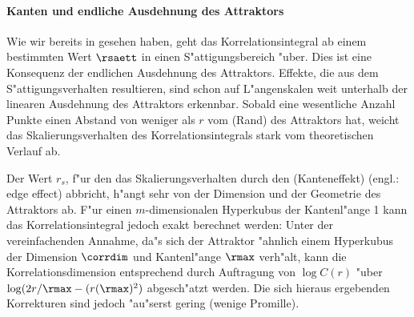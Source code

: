 \paragraph{Kanten und endliche Ausdehnung des Attraktors}
Wie wir bereits in  gesehen haben, geht das Korrelationsintegral ab einem
bestimmten Wert $\rsaett$ in einen S"attigungsbereich "uber. Dies ist eine Konsequenz der
endlichen Ausdehnung des Attraktors. Effekte, die aus dem S"attigungsverhalten resultieren, 
sind schon auf L"angen\-skalen weit unterhalb der linearen Ausdehnung des Attraktors
erkennbar. Sobald eine wesentliche Anzahl Punkte einen Abstand von weniger als $r$ vom
\naja(Rand) des Attraktors hat, weicht das Skalierungsverhalten des Korrelationsintegrals
stark vom theoretischen Verlauf ab.

Der Wert $r_s$, f"ur den das Skalierungsverhalten durch den \begriff(Kanteneffekt)
(engl.: edge effect) abbricht, h"angt sehr von
der Dimension und der Geometrie des Attraktors ab. 
F"ur einen $m$-dimensionalen Hyperkubus der Kantenl"ange 1 kann das 
Korrelationsintegral jedoch exakt berechnet werden\footnotemark:
Unter der vereinfachenden Annahme, da"s sich der Attraktor "ahnlich einem Hyperkubus
der Dimension $\corrdim$ und Kantenl"ange $\rmax$ verh"alt, kann die Korrelationsdimension entsprechend
 durch Auftragung von $\log C(r)$ "uber $\log(2r/\rmax-(r(\rmax)^2)$
abgesch"atzt werden. Die sich hieraus ergebenden Korrekturen  
sind jedoch "au"serst gering (wenige Promille).

